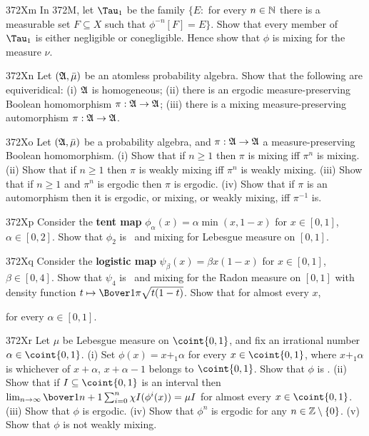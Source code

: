 {\spheader 372Xm In 372M, let $\Tau_1$ be the family $\{E:$ for every
$n\in\Bbb N$ there is a measurable set $F\subseteq X$ such that
$\phi^{-n}[F]=E\}$.   Show that every member of $\Tau_1$ is either
negligible or conegligible.      Hence show that $\phi$ is mixing for the
measure $\nu$.

\spheader 372Xn Let $(\frak A,\bar\mu)$ be an atomless probability
algebra.   Show that the following are equiveridical:  (i) $\frak A$ is
homogeneous; (ii) there is an ergodic measure-preserving Boolean
homomorphism $\pi:\frak A\to\frak A$;  (iii) there is a mixing
measure-preserving automorphism $\pi:\frak A\to\frak A$.   

\spheader 372Xo
Let $(\frak A,\bar\mu)$ be a probability algebra, and
$\pi:\frak A\to\frak A$ a measure-preserving Boolean homomorphism.   (i)
Show that if $n\ge 1$ then $\pi$ is mixing iff $\pi^n$ is mixing.   (ii)
Show that if $n\ge 1$ then $\pi$ is weakly mixing iff $\pi^n$ is weakly
mixing.   (iii)
Show that if $n\ge 1$ and $\pi^n$ is ergodic then $\pi$ is ergodic.
(iv) Show that if $\pi$ is an automorphism then it is ergodic, or
mixing, or weakly mixing, iff $\pi^{-1}$ is.

\sqheader 372Xp Consider the {\bf tent map}
$\phi_{\alpha}(x)=\alpha\min(x,1-x)$ for $x\in[0,1]$,
$\alpha\in[0,2]$.   Show that $\phi_2$ is \imp\ and mixing for Lebesgue
measure on $[0,1]$.   

\spheader 372Xq Consider the {\bf logistic map}
$\psi_{\beta}(x)=\beta x(1-x)$ for $x\in [0,1]$, $\beta\in[0,4]$.   Show
that $\psi_4$ is \imp\ and mixing for the Radon measure on $[0,1]$ with
density function
$t\mapsto\Bover1{\pi\sqrt{t(1-t)}}$.      Show that
for almost every $x$,


\noindent for every $\alpha\in[0,1]$.

\spheader 372Xr Let $\mu$ be Lebesgue measure on
$\coint{0,1}$, and fix an irrational number $\alpha\in\coint{0,1}$.
(i) Set $\phi(x)=x+_1\alpha$ for every
$x\in\coint{0,1}$, where $x+_1\alpha$ is whichever of $x+\alpha$,
$x+\alpha-1$ belongs to $\coint{0,1}$.    Show that $\phi$ is \imp.
(ii) Show that if $I\subseteq\coint{0,1}$ is an interval then
$\lim_{n\to\infty}\bover1{n+1}\sum_{i=0}^n\chi I(\phi^i(x))=\mu I$ for
almost every $x\in\coint{0,1}$.      (iii) Show that $\phi$ is ergodic.      (iv) Show that $\phi^n$ is
ergodic for any $n\in\Bbb Z\setminus\{0\}$.   (v) Show that $\phi$ is
not weakly mixing.

}

